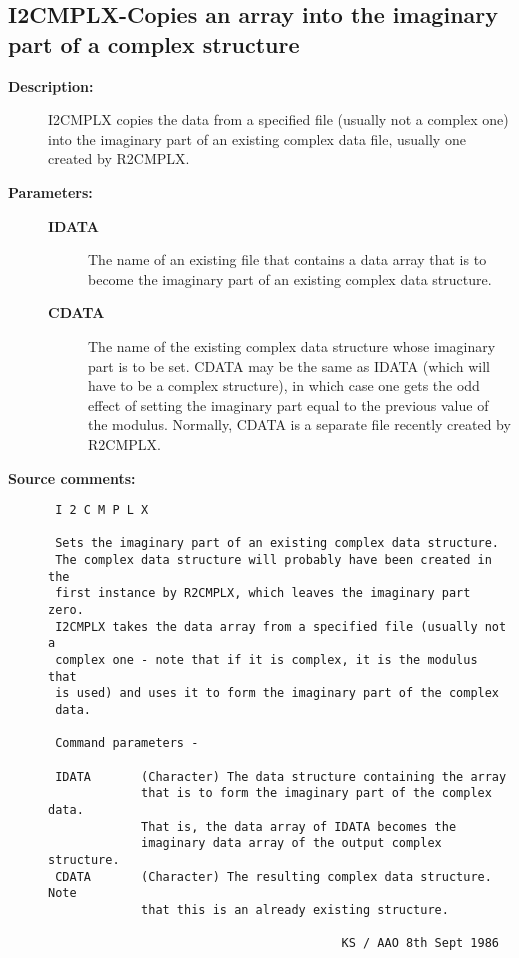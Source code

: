 \subsection{I2CMPLX-\label{I2CMPLX}Copies an array into the imaginary part of a complex structure}
\begin{description}

\item [{\bf Description:}]
 I2CMPLX copies the data from a specified file (usually not a
 complex one) into the imaginary part of an existing complex data
 file, usually one created by R2CMPLX.

\item [{\bf Parameters:}]
\begin{description}
\item [{\bf IDATA}]
 The name of an existing file that contains a data
 array that is to become the imaginary part of an
 existing complex data structure.
\item [{\bf CDATA}]
 The name of the existing complex data structure
 whose imaginary part is to be set. CDATA may be the same
 as IDATA (which will have to be a complex structure), in
 which case one gets the odd effect of setting the imaginary
 part equal to the previous value of the modulus.  Normally,
 CDATA is a separate file recently created by R2CMPLX.
\end{description}

\item [{\bf Source comments:}]
\begin{verbatim}
 I 2 C M P L X

 Sets the imaginary part of an existing complex data structure.
 The complex data structure will probably have been created in the
 first instance by R2CMPLX, which leaves the imaginary part zero.
 I2CMPLX takes the data array from a specified file (usually not a
 complex one - note that if it is complex, it is the modulus that
 is used) and uses it to form the imaginary part of the complex
 data.

 Command parameters -

 IDATA       (Character) The data structure containing the array
             that is to form the imaginary part of the complex data.
             That is, the data array of IDATA becomes the
             imaginary data array of the output complex structure.
 CDATA       (Character) The resulting complex data structure.  Note
             that this is an already existing structure.

                                         KS / AAO 8th Sept 1986
\end{verbatim}
\end{description}
